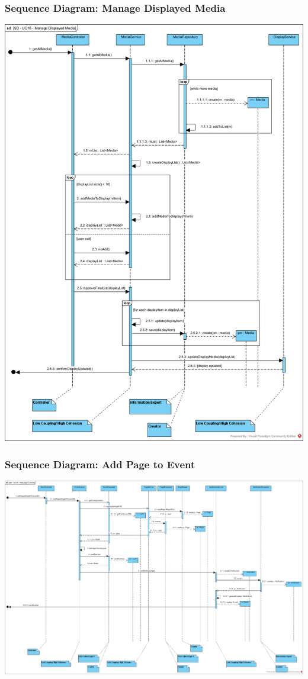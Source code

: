 \subsubsection{Sequence Diagram: Manage Displayed Media}
        \includegraphics[scale=0.55]{images/SD-UC16-ManageDisplayedMedia.png}
        \label{fig:SD-ManageDisplayedMedia}
\subsubsection{Sequence Diagram: Add Page to Event}
        \includegraphics[scale=0.33]{images/SD-UC18-AddPageToEvent.png}
        \label{fig:SD-AddPageToEvent}


